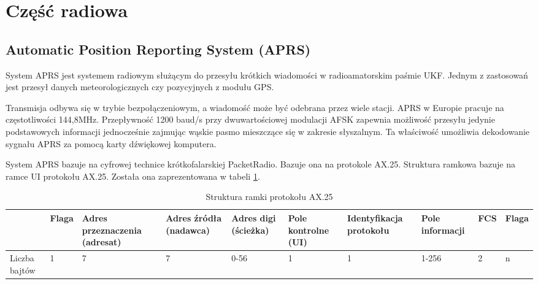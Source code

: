 \section{Część radiowa}
\subsection{Automatic Position Reporting System (APRS)}
System APRS jest systemem radiowym służącym do przesyłu krótkich wiadomości w radioamatorskim paśmie UKF. Jednym z zastosowań jest przesył danych meteorologicznych czy pozycyjnych z modułu GPS.

Transmisja odbywa się w trybie bezpołączeniowym, a wiadomość może być odebrana przez wiele stacji. APRS w Europie pracuje na częstotliwości 144,8MHz. Przepływność 1200 baud/s przy dwuwartościowej modulacji AFSK zapewnia możliwość przesyłu jedynie podstawowych informacji jednocześnie zajmując wąskie pasmo mieszczące się w zakresie słyszalnym. Ta właściwość umożliwia dekodowanie sygnału APRS za pomocą karty dźwiękowej komputera. 

System APRS bazuje na cyfrowej technice krótkofalarskiej PacketRadio. Bazuje ona na protokole AX.25. Struktura ramkowa bazuje na ramce UI protokołu AX.25. Została ona zaprezentowana w tabeli \ref{ax25}.

\begin{table}
\centering
\begin{tabular*}{\textwidth}{|p{1.2cm}|p{0.8cm}|p{1.65cm}|p{1.2cm}|p{1cm}|p{1.5cm}|p{2.1cm}|p{2cm}|p{0.7cm}|p{0.7cm}|}
\hline
 & Flaga & Adres przeznaczenia (adresat) & Adres źródła (nadawca) & Adres digi (ścieżka) & Pole kontrolne (UI) & Identyfikacja protokołu & Pole informacji & FCS & Flaga\\\hline
Liczba bajtów & 1 & 7 & 7 & 0-56 & 1 & 1 & 1-256 & 2 & n \\\hline
\end{tabular*}
\caption{Struktura ramki protokołu AX.25}
\label{ax25}
\end{table}

% 

